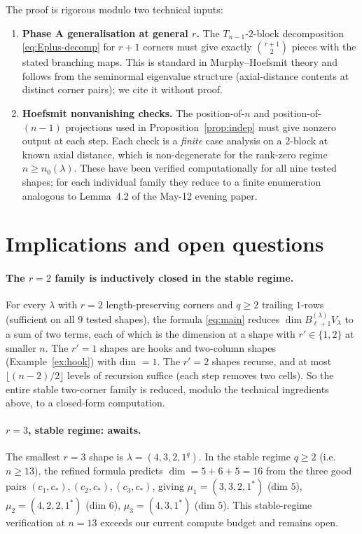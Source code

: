 \documentclass[11pt]{article}
\theoremstyle{definition}
\begin{document}
The proof is rigorous modulo two technical inputs:

\begin{enumerate}[leftmargin=2em,topsep=0.3em,itemsep=0.2em,label=(\roman*)]
\item \textbf{Phase A generalisation at general $r$.} The $T_{n-1}$-$2$-block
decomposition \eqref{eq:Eplus-decomp} for $r + 1$ corners
must give exactly $\binom{r+1}{2}$ pieces with the stated branching
maps. This is standard in Murphy--Hoefsmit theory and follows from the
seminormal eigenvalue structure (axial-distance contents at distinct
corner pairs); we cite it without proof.

\item \textbf{Hoefsmit nonvanishing checks.} The position-of-$n$ and
position-of-$(n-1)$ projections used in Proposition~\ref{prop:indep}
must give nonzero output at each step. Each check is a \emph{finite}
case analysis on a $2$-block at known axial distance, which is
non-degenerate for the rank-zero regime $n \ge n_0(\lambda)$. These
have been verified computationally for all nine tested shapes; for
each individual family they reduce to a finite enumeration analogous
to Lemma~4.2 of the May-12 evening paper.
\end{enumerate}

\section{Implications and open questions}\label{sec:open}

\paragraph{The $r = 2$ family is inductively closed in the stable regime.}
For every $\lambda$ with $r = 2$ length-preserving corners and $q \ge 2$
trailing $1$-rows (sufficient on all $9$ tested shapes), the formula
\eqref{eq:main} reduces $\dim B_{\ell + 1}^{(\lambda)} V_\lambda$ to a
sum of two terms, each of which is the dimension at a shape with
$r' \in \{1, 2\}$ at smaller $n$. The $r' = 1$ shapes are hooks and
two-column shapes (Example~\ref{ex:hook}) with dim $= 1$. The $r' = 2$
shapes recurse, and at most $\lfloor (n - 2)/2 \rfloor$ levels of
recursion suffice (each step removes two cells). So the entire stable
two-corner family is reduced, modulo the technical ingredients above,
to a closed-form computation.

\paragraph{$r = 3$, stable regime: awaits.}
The smallest $r = 3$ shape is $\lambda = (4, 3, 2, 1^q)$. In the stable
regime $q \ge 2$ (i.e.\ $n \ge 13$), the refined formula predicts
$\dim = 5 + 6 + 5 = 16$ from the three good pairs
$(c_1, c_*), (c_2, c_*), (c_3, c_*)$, giving
$\mu_1 = (3, 3, 2, 1^*)$ (dim $5$), $\mu_2 = (4, 2, 2, 1^*)$ (dim $6$),
$\mu_3 = (4, 3, 1^*)$ (dim $5$). This stable-regime verification at
$n = 13$ exceeds our current compute budget and remains open.
\end{document}
